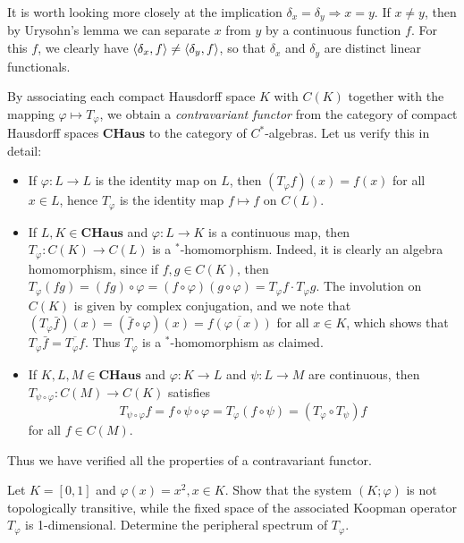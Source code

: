 \begin{remark}
	It is worth looking more closely at the implication $\delta_x = \delta_y \Rightarrow x=y$. If $x\ne y$, then by Urysohn's lemma we can separate $x$ from $y$ by a continuous function $f$. For this $f$, we clearly have $\braket{\delta_x,f} \ne \braket{\delta_y,f}$, so that $\delta_x$ and $\delta_y$ are distinct linear functionals.
\end{remark}

\begin{remark}
	By associating each compact Hausdorff space $K$ with $C(K)$ together with the mapping $\varphi \mapsto T_\varphi$, we obtain a \emph{contravariant functor} from the category of compact Hausdorff spaces $\mathbf{CHaus}$ to the category of $C^*$-algebras. Let us verify this in detail:
	\begin{itemize}
		\item If $\varphi:L \to L$ is the identity map on $L$, then $(T_\varphi f)(x) = f(x)$ for all $x\in L$, hence $T_\varphi$ is the identity map $f \mapsto f$ on $C(L)$.
		\item If $L,K \in \mathbf{CHaus}$ and $\varphi:L \to K$ is a continuous map, then $T_\varphi : C(K) \to C(L)$ is a $^*$-homomorphism. Indeed, it is clearly an algebra homomorphism, since if $f,g \in C(K)$, then $T_\varphi(fg) = (fg)\circ \varphi = (f\circ\varphi)(g\circ\varphi) = T_\varphi f \cdot T_\varphi g$. The involution on $C(K)$ is given by complex conjugation, and we note that $(T_{\varphi}\bar{f})(x) = (\bar{f}\circ\varphi)(x) = \overline{f(\varphi(x))}$ for all $x\in K$, which shows that $T_\varphi \bar{f} = \overline{T_\varphi f}$. Thus $T_\varphi$ is a $^*$-homomorphism as claimed.
		\item If $K,L,M \in \mathbf{CHaus}$ and $\varphi:K \to L$ and $\psi:L \to M$ are continuous, then $T_{\psi\circ\varphi}:C(M) \to C(K)$ satisfies
		\begin{equation*}
			T_{\psi \circ \varphi}f = f\circ\psi\circ\varphi = T_\varphi(f\circ\psi) = (T_\varphi \circ T_\psi)f
		\end{equation*}
		for all $f\in C(M)$.
	\end{itemize}
	Thus we have verified all the properties of a contravariant functor.
\end{remark}

\begin{exercise}[Ex.\ 4.2]
	Let $K=[0,1]$ and $\varphi(x)=x^2, x\in K$. Show that the system $(K;\varphi)$ is not topologically transitive, while the fixed space of the associated Koopman operator $T_\varphi$ is 1-dimensional. Determine the peripheral spectrum of $T_\varphi$.
\end{exercise}


